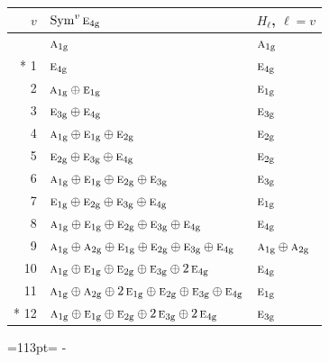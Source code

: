 \documentclass[10pt,a4paper]{article}
\newcommand{\needspace}[1]{\par\penalty-100\begingroup\dimen0=#1\relax\dimen2=\pagegoal
  \advance\dimen2-\pagetotal\ifdim\dimen0>\dimen2\relax\ifdim\dimen2>0pt\vfil\break\fi\fi
  \endgroup}
\numberwithin{equation}{section}
\newcommand{\irr}[1]{\text{\normalfont\scshape #1}}
\newcommand{\ptag}[1]{\mathrm{#1}}
\begin{document}
{\small\begin{longtable}{@{}rll@{}}\toprule
$v$ & $\operatorname{Sym}^{v}\irr{e}_{4\ptag{g}}$ & $H_\ell$, $\ell = v$\\\midrule\endhead
\bottomrule\endfoot\endlastfoot
0 & $\irr{a}_{1\ptag{g}}$ & $\irr{a}_{1\ptag{g}}$\\*
1 & $\irr{e}_{4\ptag{g}}$ & $\irr{e}_{4\ptag{g}}$\\
2 & $\irr{a}_{1\ptag{g}} \oplus \irr{e}_{1\ptag{g}}$ & $\irr{e}_{1\ptag{g}}$\\
3 & $\irr{e}_{3\ptag{g}} \oplus \irr{e}_{4\ptag{g}}$ & $\irr{e}_{3\ptag{g}}$\\
4 & $\irr{a}_{1\ptag{g}} \oplus \irr{e}_{1\ptag{g}} \oplus \irr{e}_{2\ptag{g}}$ & $\irr{e}_{2\ptag{g}}$\\
5 & $\irr{e}_{2\ptag{g}} \oplus \irr{e}_{3\ptag{g}} \oplus \irr{e}_{4\ptag{g}}$ & $\irr{e}_{2\ptag{g}}$\\
6 & $\irr{a}_{1\ptag{g}} \oplus \irr{e}_{1\ptag{g}} \oplus \irr{e}_{2\ptag{g}} \oplus \irr{e}_{3\ptag{g}}$ & $\irr{e}_{3\ptag{g}}$\\
7 & $\irr{e}_{1\ptag{g}} \oplus \irr{e}_{2\ptag{g}} \oplus \irr{e}_{3\ptag{g}} \oplus \irr{e}_{4\ptag{g}}$ & $\irr{e}_{1\ptag{g}}$\\
8 & $\irr{a}_{1\ptag{g}} \oplus \irr{e}_{1\ptag{g}} \oplus \irr{e}_{2\ptag{g}} \oplus \irr{e}_{3\ptag{g}} \oplus \irr{e}_{4\ptag{g}}$ & $\irr{e}_{4\ptag{g}}$\\
9 & $\irr{a}_{1\ptag{g}} \oplus \irr{a}_{2\ptag{g}} \oplus \irr{e}_{1\ptag{g}} \oplus \irr{e}_{2\ptag{g}} \oplus \irr{e}_{3\ptag{g}} \oplus \irr{e}_{4\ptag{g}}$ & $\irr{a}_{1\ptag{g}} \oplus \irr{a}_{2\ptag{g}}$\\
10 & $\irr{a}_{1\ptag{g}} \oplus \irr{e}_{1\ptag{g}} \oplus \irr{e}_{2\ptag{g}} \oplus \irr{e}_{3\ptag{g}} \oplus 2\,\irr{e}_{4\ptag{g}}$ & $\irr{e}_{4\ptag{g}}$\\
11 & $\irr{a}_{1\ptag{g}} \oplus \irr{a}_{2\ptag{g}} \oplus 2\,\irr{e}_{1\ptag{g}} \oplus \irr{e}_{2\ptag{g}} \oplus \irr{e}_{3\ptag{g}} \oplus \irr{e}_{4\ptag{g}}$ & $\irr{e}_{1\ptag{g}}$\\*
12 & $\irr{a}_{1\ptag{g}} \oplus \irr{e}_{1\ptag{g}} \oplus \irr{e}_{2\ptag{g}} \oplus 2\,\irr{e}_{3\ptag{g}} \oplus 2\,\irr{e}_{4\ptag{g}}$ & $\irr{e}_{3\ptag{g}}$\\
\bottomrule\end{longtable}}
\needspace{113pt}
\end{document}

